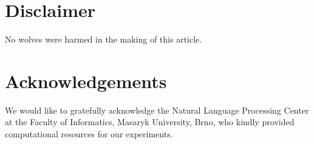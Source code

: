 \documentclass[final]{ltugboat}
\begin{document}
\medskip
\noindent


\section*{Disclaimer}
No wolves were harmed in the making of this article.

\section*{Acknowledgements}
We would like to gratefully acknowledge the Natural Language Processing Center at the Faculty of Informatics, Masaryk University, Brno, who kindly provided computational resources for our experiments.


\begingroup
\gappto{\UrlBreaks}{\UrlOrds}
\RaggedRight

\endgroup

\makesignature
\end{document}
